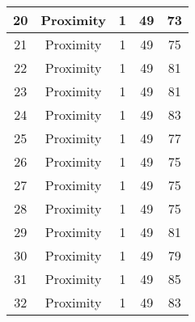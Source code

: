 \documentclass[results.tex]{subfiles}
\begin{document}
\begin{center}
\begin{tabular}{| c || c | c | c | c |}
            \hline
            20                      & Proximity                    & 1                      & 49                      & 73                   \\
            \hline
            21                      & Proximity                    & 1                      & 49                      & 75                   \\
            \hline
            22                      & Proximity                    & 1                      & 49                      & 81                   \\
            \hline
            23                      & Proximity                    & 1                      & 49                      & 81                   \\
            \hline
            24                      & Proximity                    & 1                      & 49                      & 83                   \\
            \hline
            25                      & Proximity                    & 1                      & 49                      & 77                   \\
            \hline
            26                      & Proximity                    & 1                      & 49                      & 75                   \\
            \hline
            27                      & Proximity                    & 1                      & 49                      & 75                   \\
            \hline
            28                      & Proximity                    & 1                      & 49                      & 75                   \\
            \hline
            29                      & Proximity                    & 1                      & 49                      & 81                   \\
            \hline
            30                      & Proximity                    & 1                      & 49                      & 79                   \\
            \hline
            31                      & Proximity                    & 1                      & 49                      & 85                   \\
            \hline
            32                      & Proximity                    & 1                      & 49                      & 83                   \\

\end{tabular}
\end{center}
\end{document}
